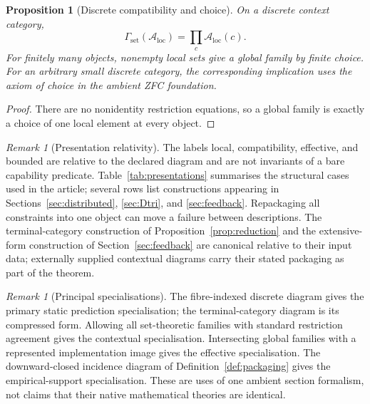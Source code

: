 \documentclass[11pt]{article}
\theoremstyle{plain}
\newtheorem{proposition}[theorem]{Proposition}
\theoremstyle{definition}
\theoremstyle{remark}
\newtheorem{remark}[theorem]{Remark}
\newcommand{\LocalAdm}{\mathcal{A}_{\mathrm{loc}}}
\begin{document}
\begin{proposition}[Discrete compatibility and choice]\label{prop:discreteVanishing}
On a discrete context category,
\[
\Gamma_{\mathrm{set}}(\LocalAdm)=\prod_c\LocalAdm(c).
\]
For finitely many objects, nonempty local sets give a global family by finite
choice. For an arbitrary small discrete category, the corresponding implication
uses the axiom of choice in the ambient ZFC foundation.
\end{proposition}

\begin{proof}
There are no nonidentity restriction equations, so a global family is exactly a
choice of one local element at every object.
\end{proof}

\begin{remark}[Presentation relativity]\label{rem:presentation}
The labels local, compatibility, effective, and bounded are relative to the
declared diagram and are not invariants of a bare capability predicate. Table~\ref{tab:presentations} summarises the structural cases used in the article; several rows list constructions appearing in Sections~\ref{sec:distributed}, \ref{sec:Dtri}, and \ref{sec:feedback}. Repackaging all constraints into one object can move a failure
between descriptions. The terminal-category construction of Proposition~\ref{prop:reduction} and the extensive-form
construction of Section~\ref{sec:feedback} are canonical relative to their input
data; externally supplied contextual diagrams carry their stated packaging as
part of the theorem.
\end{remark}







\begin{remark}[Principal specialisations]
The fibre-indexed discrete diagram gives the primary static prediction
specialisation; the terminal-category diagram is its compressed form. Allowing all
set-theoretic families with standard restriction agreement gives the contextual
specialisation. Intersecting global families with a represented implementation
image gives the effective specialisation. The downward-closed incidence diagram
of Definition~\ref{def:packaging} gives the empirical-support specialisation.
These are uses of one ambient section formalism, not claims that their native
mathematical theories are identical.
\end{remark}
\end{document}
